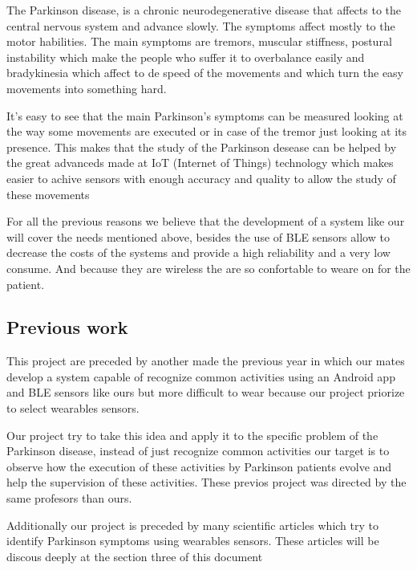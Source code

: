 \documentclass[11pt,spanish]{article}
\begin{document}
The Parkinson disease, is a chronic neurodegenerative disease that affects to the central nervous system and advance slowly. The symptoms affect mostly to the motor habilities. The main symptoms are tremors, muscular stiffness, postural instability which make the people who suffer it to overbalance easily and bradykinesia which affect to de speed of the movements and which turn the easy movements into something hard.
\newline

It's easy to see that the main Parkinson's symptoms can be measured looking at the way some movements are executed or in case of the tremor just looking at its presence. This makes that the study of the Parkinson desease can be helped by the great advanceds made at IoT (Internet of Things) technology which makes easier to achive sensors with enough accuracy and quality to allow the study of these movements
\newline

For all the previous reasons we believe that the development of a system like our will cover the needs mentioned above, besides the use of BLE sensors allow to decrease the costs of the systems and provide a high reliability and a very low consume. And because they are wireless the are so confortable to weare on for the patient.
\newline

\subsection{Previous work}

This project are preceded by another made the previous year \cite{TFG_Anterior} in which our mates develop a system capable of recognize common activities using an Android app and BLE sensors like ours but more difficult to wear because our project priorize to select wearables sensors.
\newline

Our project try to take this idea and apply it to the specific problem of the Parkinson disease, instead of just recognize common activities our target is to observe how the execution of these activities by Parkinson patients evolve and help the supervision of these activities. These previos project was directed by the same profesors than ours.
\newline

Additionally our project is preceded by many scientific articles which try to identify Parkinson symptoms using wearables sensors. These articles will be discous deeply at the section three of this document
\newline
\end{document}
